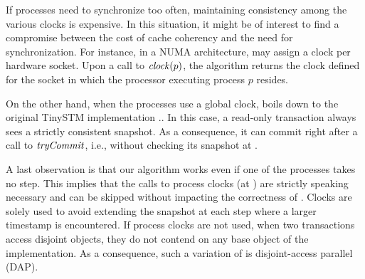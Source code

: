 If processes need to synchronize too often, maintaining consistency among the various clocks is expensive.
In this situation, it might be of interest to find a compromise between the cost of cache coherency and the need for synchronization.
For instance, in a NUMA architecture,  may assign a clock per hardware socket.
Upon a call to $\clockOf{p}$, the algorithm returns the clock defined for the socket in which the processor executing process $p$ resides.

On the other hand, when the processes use a global clock,  boils down to the original TinySTM implementation \cite{FelberFMR10}..
In this case, a read-only transaction always sees a strictly consistent snapshot.
As a consequence, it can commit right after a call to $\stmTryCommitFunction$, i.e., without checking its snapshot at .

A last observation is that our algorithm works even if one of the processes takes no step.
This implies that the calls to process clocks (at ) are strictly speaking necessary and can be skipped without impacting the correctness of .
Clocks are solely used to avoid extending the snapshot at each step where a larger timestamp is encountered.
If process clocks are not used, when two transactions access disjoint objects, they do not contend on any base object of the implementation.
As a consequence, such a variation of  is disjoint-access parallel (DAP).
